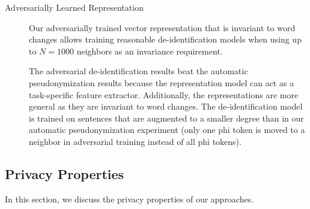 \begin{description}
    \item[Adversarially Learned Representation]
    Our adversarially trained vector representation that is invariant to word changes allows training reasonable de-identification models when using up to $N=1000$ neighbors as an invariance requirement.
    
    The adversarial de-identification results beat the automatic pseudonymization results because the representation model can act as a task-specific feature extractor.
    Additionally, the representations are more general as they are invariant to word changes.
    The de-identification model is trained on sentences that are augmented to a smaller degree than in our automatic pseudonymization experiment (only one \ac{phi} token is moved to a neighbor in adversarial training instead of all \ac{phi} tokens).
    
\end{description}

\subsection{Privacy Properties}
%
In this section, we discuss the privacy properties of our approaches.

